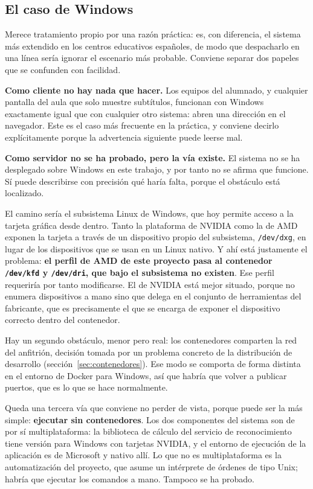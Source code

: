 \subsection*{El caso de Windows}

Merece tratamiento propio por una razón práctica: es, con diferencia, el sistema más
extendido en los centros educativos españoles, de modo que despacharlo en una línea sería
ignorar el escenario más probable. Conviene separar dos papeles que se confunden con
facilidad.

\textbf{Como cliente no hay nada que hacer.} Los equipos del alumnado, y cualquier pantalla
del aula que solo muestre subtítulos, funcionan con Windows exactamente igual que con
cualquier otro sistema: abren una dirección en el navegador. Este es el caso más frecuente
en la práctica, y conviene decirlo explícitamente porque la advertencia siguiente puede
leerse mal.

\textbf{Como servidor no se ha probado, pero la vía existe.} El sistema no se ha desplegado
sobre Windows en este trabajo, y por tanto no se afirma que funcione. Sí puede describirse
con precisión qué haría falta, porque el obstáculo está localizado.

El camino sería el subsistema Linux de Windows, que hoy permite acceso a la tarjeta gráfica
desde dentro. Tanto la plataforma de NVIDIA \cite{microsoft2024cudawsl} como la de AMD
\cite{amd2025rocmwsl} exponen la tarjeta a través de un dispositivo propio del subsistema,
\texttt{/dev/dxg}, en lugar de los dispositivos que se usan en un Linux nativo. Y ahí está
justamente el problema: \textbf{el perfil de AMD de este proyecto pasa al contenedor
\texttt{/dev/kfd} y \texttt{/dev/dri}, que bajo el subsistema no existen}. Ese perfil
requeriría por tanto modificarse. El de NVIDIA está mejor situado, porque no enumera
dispositivos a mano sino que delega en el conjunto de herramientas del fabricante, que es
precisamente el que se encarga de exponer el dispositivo correcto dentro del contenedor.

Hay un segundo obstáculo, menor pero real: los contenedores comparten la red del anfitrión,
decisión tomada por un problema concreto de la distribución de desarrollo
(sección~\ref{sec:contenedores}). Ese modo se comporta de forma distinta en el entorno de
Docker para Windows, así que habría que volver a publicar puertos, que es lo que se hace
normalmente.

Queda una tercera vía que conviene no perder de vista, porque puede ser la más simple:
\textbf{ejecutar sin contenedores}. Los dos componentes del sistema son de por sí
multiplataforma: la biblioteca de cálculo del servicio de reconocimiento tiene versión para
Windows con tarjetas NVIDIA, y el entorno de ejecución de la aplicación es de Microsoft y
nativo allí. Lo que no es multiplataforma es la automatización del proyecto, que asume un
intérprete de órdenes de tipo Unix; habría que ejecutar los comandos a mano. Tampoco se ha
probado.

